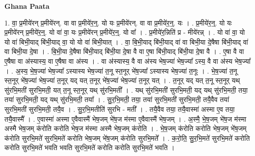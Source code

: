 \documentclass[17pt]{extarticle}
\begin{document}
\textbf{Ghana Paata } \newline

1. वा॒ प्र॒मीये॑रन् प्र॒मीये॑रन्. वा वा प्र॒मीये॑र॒न्॒. यो यः प्र॒मीये॑रन्. वा वा प्र॒मीये॑र॒न्॒. यः । . प्र॒मीये॑र॒न्॒. यो यः प्र॒मीये॑रन् प्र॒मीये॑र॒न्॒. यो वा॑ वा॒ यः प्र॒मीये॑रन् प्र॒मीये॑र॒न्॒. यो वा᳚ । . प्र॒मीये॑र॒न्निति॑ प्र - मीये॑रन्न् । . यो वा॑ वा॒ यो यो वा॑ बिभी॒याद् बि॑भी॒याद् वा॒ यो यो वा॑ बिभी॒यात् । . वा॒ बि॒भी॒याद् बि॑भी॒याद् वा॑ वा बिभी॒या दे॒षैषा बि॑भी॒याद् वा॑ वा बिभी॒या दे॒षा । . बि॒भी॒या दे॒षैषा बि॑भी॒याद् बि॑भी॒या दे॒षा वै वा ए॒षा बि॑भी॒याद् बि॑भी॒या दे॒षा वै । . ए॒षा वै वा ए॒षैषा वा अ॑स्यास्य॒ वा ए॒षैषा वा अ॑स्य । . वा अ॑स्यास्य॒ वै वा अ॑स्य भेष॒ज्या॑ भेष॒ज्या᳚ ऽस्य॒ वै वा अ॑स्य भेष॒ज्या᳚ । . अ॒स्य॒ भे॒ष॒ज्या॑ भेष॒ज्या᳚ ऽस्यास्य भेष॒ज्या॑ त॒नू स्त॒नूर् भे॑ष॒ज्या᳚ ऽस्यास्य भेष॒ज्या॑ त॒नूः । . भे॒ष॒ज्या॑ त॒नू स्त॒नूर् भे॑ष॒ज्या॑ भेष॒ज्या॑ त॒नूर् यद् यत् त॒नूर् भे॑ष॒ज्या॑ भेष॒ज्या॑ त॒नूर् यत् । . त॒नूर् यद् यत् त॒नू स्त॒नूर् यथ् सु॑रभि॒मती॑ सुरभि॒मती॒ यत् त॒नू स्त॒नूर् यथ् सु॑रभि॒मती᳚ । . यथ् सु॑रभि॒मती॑ सुरभि॒मती॒ यद् यथ् सु॑रभि॒मती॒ तया॒ तया॑ सुरभि॒मती॒ यद् यथ् सु॑रभि॒मती॒ तया᳚ । . सु॒र॒भि॒मती॒ तया॒ तया॑ सुरभि॒मती॑ सुरभि॒मती॒ तयै॒वैव तया॑ सुरभि॒मती॑ सुरभि॒मती॒ तयै॒व । . सु॒र॒भि॒मतीति॑ सुरभि - मती᳚ । . तयै॒वैव तया॒ तयै॒वास्मा॑ अस्मा ए॒व तया॒ तयै॒वास्मै᳚ । . ए॒वास्मा॑ अस्मा ए॒वैवास्मै॑ भेष॒जम् भे॑ष॒ज म॑स्मा ए॒वैवास्मै॑ भेष॒जम् । . अ॒स्मै॒ भे॒ष॒जम् भे॑ष॒ज म॑स्मा अस्मै भेष॒जम् क॑रोति करोति भेष॒ज म॑स्मा अस्मै भेष॒जम् क॑रोति । . भे॒ष॒जम् क॑रोति करोति भेष॒जम् भे॑ष॒जम् क॑रोति सुरभि॒मते॑ सुरभि॒मते॑ करोति भेष॒जम् भे॑ष॒जम् क॑रोति सुरभि॒मते᳚ । . क॒रो॒ति॒ सु॒र॒भि॒मते॑ सुरभि॒मते॑ करोति करोति सुरभि॒मते॑ भवति भवति सुरभि॒मते॑ करोति करोति सुरभि॒मते॑ भवति । \newline
\end{document}
